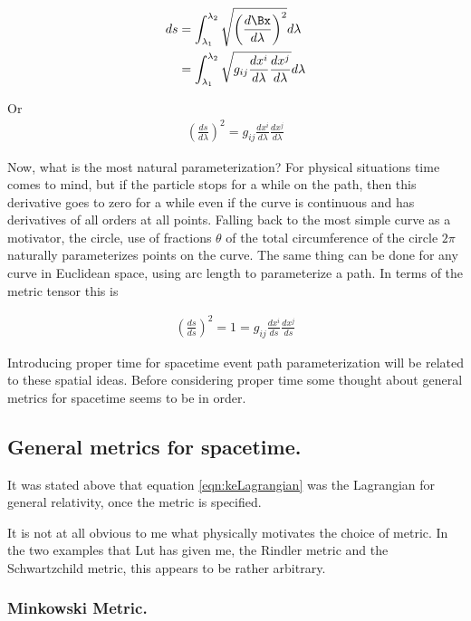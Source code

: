 \documentclass{article}      %
\begin{document}
\begin{align*}
ds
&= \int_{\lambda_1}^{\lambda_2} \sqrt{\left(\frac{d\Bx}{d\lambda}\right)^2} d\lambda \\
&= \int_{\lambda_1}^{\lambda_2} \sqrt{ g_{ i j } \frac{dx^i}{d\lambda} \frac{dx^j}{d\lambda} } d\lambda \\
\end{align*}

Or
\begin{align*}
\left(\frac{ds}{d\lambda}\right)^2 = g_{ i j } \frac{dx^i}{d\lambda} \frac{dx^j}{d\lambda}
\end{align*}

Now, what is the most natural parameterization?  For physical situations time comes to mind, but if the particle stops for a
while on the path, then this derivative goes to zero for a while even if the curve is continuous and has derivatives of all
orders at all points.  Falling back to the most simple curve as a motivator, the circle, 
use of fractions $\theta$ of the total circumference of the circle $2\pi$ naturally parameterizes points on the curve.  The same thing can be done for any
curve in Euclidean space, using arc length to parameterize a path.  In terms
of the metric tensor this is

\begin{align*}
\left(\frac{ds}{ds}\right)^2 = 1 = g_{ i j } \frac{dx^i}{ds} \frac{dx^j}{ds}
\end{align*}

Introducing proper time for spacetime event path parameterization will 
be related to these spatial ideas.  Before considering proper time some 
thought about general metrics for spacetime seems to be in order.

\subsection{ General metrics for spacetime. }

It was stated above that equation \ref{eqn:keLagrangian} was the 
Lagrangian for general relativity, once the metric is specified.

It is not
at all obvious to me what physically motivates the choice of metric.
In the two examples that Lut has given me, the Rindler metric and the
Schwartzchild metric, this appears to be rather arbitrary.

\subsubsection{ Minkowski Metric. }
\end{document}
